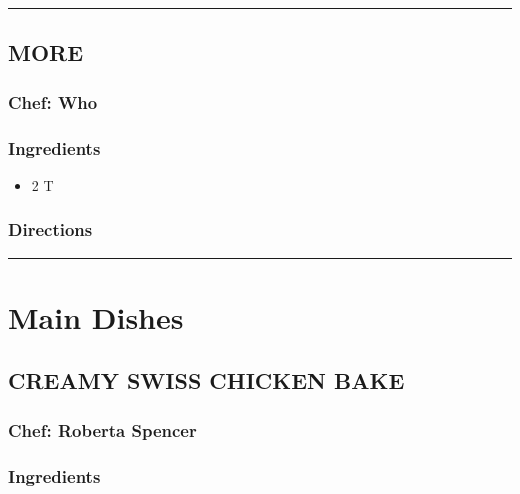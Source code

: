 \documentclass[
]{book}
\providecommand{\tightlist}{%
  \setlength{\itemsep}{0pt}\setlength{\parskip}{0pt}}
\begin{document}
\begin{center}\rule{0.5\linewidth}{0.5pt}\end{center}

\hypertarget{more-1}{%
\section*{MORE}\label{more-1}}


\hypertarget{chef-who-1}{%
\subsection*{Chef: Who}\label{chef-who-1}}


\hypertarget{ingredients-38}{%
\subsection*{Ingredients}\label{ingredients-38}}


\begin{itemize}
\tightlist
\item
  2 T
\end{itemize}

\hypertarget{directions-38}{%
\subsection*{Directions}\label{directions-38}}


\begin{center}\rule{0.5\linewidth}{0.5pt}\end{center}

\hypertarget{Main}{%
\chapter{Main Dishes}\label{Main}}

\hypertarget{creamy-swiss-chicken-bake}{%
\section*{CREAMY SWISS CHICKEN BAKE}\label{creamy-swiss-chicken-bake}}


\hypertarget{chef-roberta-spencer-12}{%
\subsection*{Chef: Roberta Spencer}\label{chef-roberta-spencer-12}}


\hypertarget{ingredients-39}{%
\subsection*{Ingredients}\label{ingredients-39}}
\end{document}
